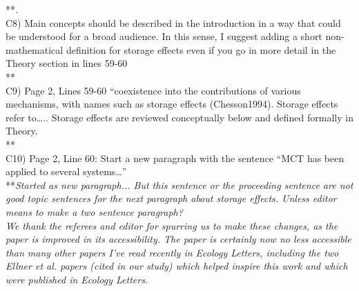\documentclass[letterpaper,11pt]{article}
\begin{document}
\noindent ***\emph{. } \\


\noindent C8) Main concepts should be described in the introduction in a way that could be understood for a broad audience. In this sense, I suggest adding a short non- mathematical definition for storage effects even if you go in more detail in the Theory section in lines 59-60 \\

\noindent ***\emph{} \\

\noindent C9) Page 2, Lines 59-60 “coexistence into the contributions of various mechanisms, with names such as storage effects (Chesson1994). Storage effects refer to….. Storage effects are reviewed conceptually below and defined formally in Theory. \\  

\noindent ***\emph{} \\

\noindent C10)  Page 2, Line 60: Start a new paragraph with the sentence “MCT has been applied to several systems…” \\

\noindent ***\emph{Started as new paragraph... But this sentence or the proceeding sentence are not good topic sentences for the next paragraph about storage effects. Unless editor means to make a two sentence paragraph?} \\

\emph{We thank the referees and editor for spurring us to make these changes, as the paper is improved in
its accessibility. The paper is certainly now no less accessible than many other papers I've read recently in 
Ecology Letters, including the two Ellner et al. papers (cited in our study) which helped inspire this 
work and which were published in Ecology Letters.} 
\end{document}
